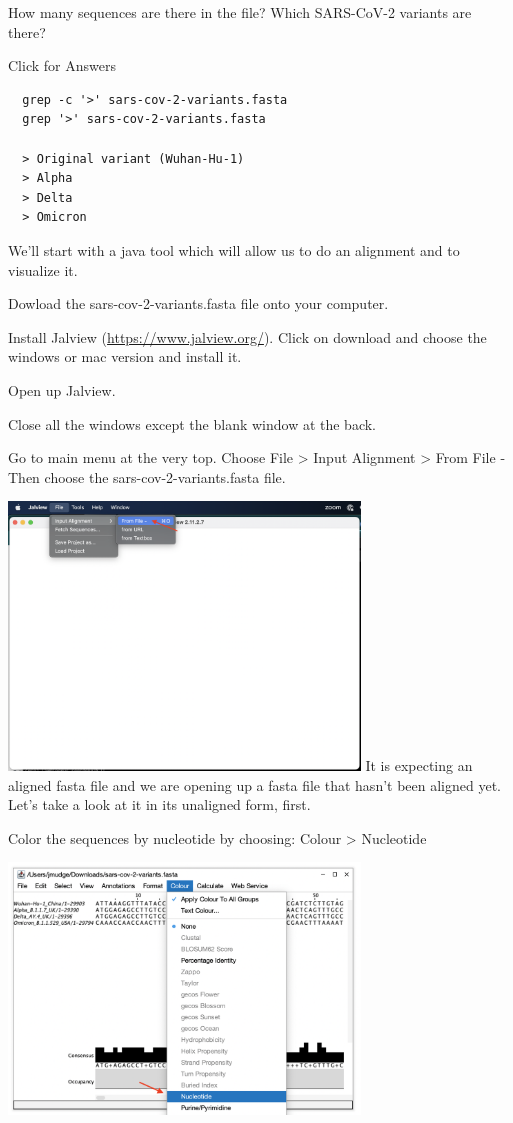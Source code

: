 \documentclass[
]{book}
\begin{document}
\hfill\break

How many sequences are there in the file?
Which SARS-CoV-2 variants are there?

Click for Answers

\begin{verbatim}
  grep -c '>' sars-cov-2-variants.fasta
  grep '>' sars-cov-2-variants.fasta
  
  > Original variant (Wuhan-Hu-1)
  > Alpha
  > Delta
  > Omicron
\end{verbatim}

\hfill\break

We'll start with a java tool which will allow us to do an alignment and to visualize it.

Dowload the sars-cov-2-variants.fasta file onto your computer.

Install Jalview (\url{https://www.jalview.org/}). Click on download and choose the windows or mac version and install it.

Open up Jalview.

Close all the windows except the blank window at the back.

Go to main menu at the very top. Choose File \textgreater{} Input Alignment \textgreater{} From File -
Then choose the sars-cov-2-variants.fasta file.

\includegraphics[width=0.7\textwidth,height=\textheight]{./Figures/open.png}
It is expecting an aligned fasta file and we are opening up a fasta file that hasn't been aligned yet. Let's take a look at it in its unaligned form, first.

Color the sequences by nucleotide by choosing:
Colour \textgreater{} Nucleotide

\includegraphics[width=0.7\textwidth,height=\textheight]{./Figures/color.png}
\end{document}
